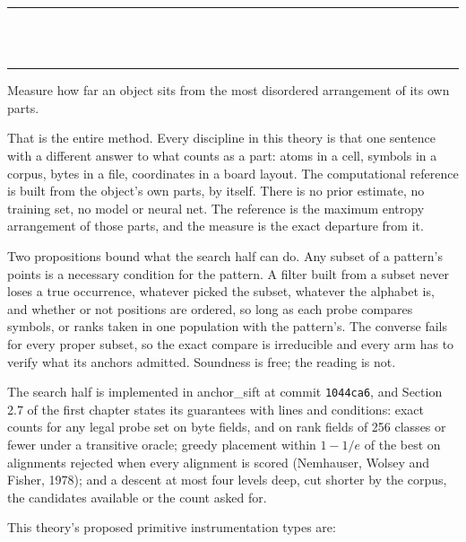 \thispagestyle{empty}
\begin{center}
  \rule{\textwidth}{0.4pt}\\[0.9em]
  {\Large{}}\\[0.7em]
  \rule{\textwidth}{0.4pt}
\end{center}
\bigskip

\noindent Measure how far an object sits from the most disordered arrangement of its own parts.

That is the entire method. Every discipline in this theory is that one sentence with a different answer to
what counts as a part: atoms in a cell, symbols in a corpus, bytes in a file, coordinates in a board
layout. The computational reference is built from the object's own parts, by itself. There is no prior
estimate, no training set, no model or neural net. The reference is the maximum entropy arrangement of
those parts, and the measure is the exact departure from it.

Two propositions bound what the search half can do. Any subset of a pattern's points is a necessary
condition for the pattern. A filter built from a subset never loses a true occurrence, whatever
picked the subset, whatever the alphabet is, and whether or not positions are ordered, so long as
each probe compares symbols, or ranks taken in one population with the pattern's. The converse fails for every proper subset, so the exact compare is irreducible and every
arm has to verify what its anchors admitted. Soundness is free; the reading is not.

The search half is implemented in anchor\_sift at commit \texttt{1044ca6}, and Section 2.7 of the
first chapter states its guarantees with lines and conditions: exact counts for any legal probe set
on byte fields, and on rank fields of 256 classes or fewer under a transitive oracle; greedy
placement within \(1 - 1/e\) of the best on alignments rejected when every alignment is scored
(Nemhauser, Wolsey and Fisher, 1978); and a descent at most four levels deep, cut shorter by the
corpus, the candidates available or the count asked for.

This theory's proposed primitive instrumentation types are:

